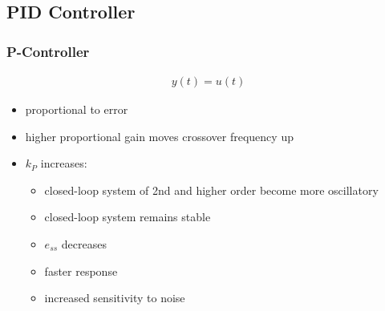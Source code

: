 \subsection{PID Controller}
    \subsubsection{P-Controller}
            \begin{align*}
                y(t) = u(t)
            \end{align*}
        \begin{itemize}
            \item proportional to error
            \item higher proportional gain moves crossover frequency up
            \item $k_P$ increases:
            \begin{itemize}
                \item closed-loop system of 2nd and higher order become more oscillatory
                \item closed-loop system remains stable
                \item $e_{ss}$ decreases
                \item faster response
                \item increased sensitivity to noise
            \end{itemize}
        \end{itemize}

